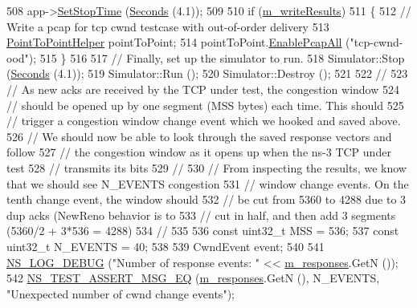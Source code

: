 \begin{DoxyCode}
508   app->\hyperlink{classns3_1_1Application_a732c1fdadf0be176c753a2ce6e27dff9}{SetStopTime} (\hyperlink{group__timecivil_ga33c34b816f8ff6628e33d5c8e9713b9e}{Seconds} (4.1));
509 
510   \textcolor{keywordflow}{if} (\hyperlink{classNs3TcpCwndTestCase2_a93541c9850b39d47ad1d2ebfd640d722}{m\_writeResults})
511     \{
512       \textcolor{comment}{// Write a pcap for tcp cwnd testcase with out-of-order delivery}
513       \hyperlink{classns3_1_1PointToPointHelper}{PointToPointHelper} pointToPoint;
514       pointToPoint.\hyperlink{classns3_1_1PcapHelperForDevice_a4ab183a2512120200d4a0e5d8ececd49}{EnablePcapAll} (\textcolor{stringliteral}{"tcp-cwnd-ood"});
515     \}
516 
517   \textcolor{comment}{// Finally, set up the simulator to run.}
518   Simulator::Stop (\hyperlink{group__timecivil_ga33c34b816f8ff6628e33d5c8e9713b9e}{Seconds} (4.1));
519   Simulator::Run ();
520   Simulator::Destroy ();
521 
522   \textcolor{comment}{//}
523   \textcolor{comment}{// As new acks are received by the TCP under test, the congestion window }
524   \textcolor{comment}{// should be opened up by one segment (MSS bytes) each time.  This should}
525   \textcolor{comment}{// trigger a congestion window change event which we hooked and saved above.}
526   \textcolor{comment}{// We should now be able to look through the saved response vectors and follow}
527   \textcolor{comment}{// the congestion window as it opens up when the ns-3 TCP under test }
528   \textcolor{comment}{// transmits its bits}
529   \textcolor{comment}{//}
530   \textcolor{comment}{// From inspecting the results, we know that we should see N\_EVENTS congestion}
531   \textcolor{comment}{// window change events. On the tenth change event, the window should }
532   \textcolor{comment}{// be cut from 5360 to 4288 due to 3 dup acks (NewReno behavior is to}
533   \textcolor{comment}{// cut in half, and then add 3 segments (5360/2 + 3*536 = 4288)}
534   \textcolor{comment}{//}
535   
536   \textcolor{keyword}{const} uint32\_t MSS = 536;
537   \textcolor{keyword}{const} uint32\_t N\_EVENTS = 40;
538 
539   CwndEvent event;
540 
541   \hyperlink{group__logging_ga413f1886406d49f59a6a0a89b77b4d0a}{NS\_LOG\_DEBUG} (\textcolor{stringliteral}{"Number of response events: "} << \hyperlink{classNs3TcpCwndTestCase2_ab2e45e18596ca237cd979daccdcf65b2}{m\_responses}.GetN ());
542   \hyperlink{group__testing_ga2a9d78cffb3db8e867c35fff0b698cf5}{NS\_TEST\_ASSERT\_MSG\_EQ} (\hyperlink{classNs3TcpCwndTestCase2_ab2e45e18596ca237cd979daccdcf65b2}{m\_responses}.GetN (), N\_EVENTS, \textcolor{stringliteral}{"Unexpected number
       of cwnd change events"});

\end{DoxyCode}
